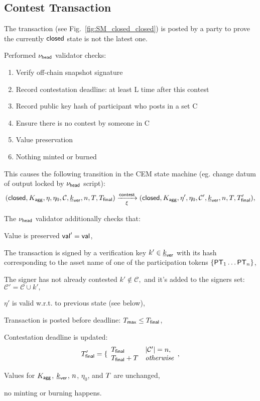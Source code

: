 \subsection{Contest Transaction} 

The \mtxContest{} transaction (see
Fig.~\ref{fig:SM_closed_closed}) is posted by a party to prove the currently $\mathsf{closed}$ state is not the latest one. 

\noindent Performed $\nu_\mathsf{head}$ validator checks:
\begin{enumerate}
   \item Verify off-chain snapshot signature
   \item Record contestation deadline: at least L time after this contest
   \item Record public key hash of participant who posts in a set C
   \item Ensure there is no contest by someone in C
   \item Value preservation
   \item Nothing minted or burned
\end{enumerate}

\noindent This causes the following transition in the CEM state machine (eg. change datum of output locked by $\nu_\mathsf{head}$ script):
$$
   (\mathsf{closed},K_{\mathsf{agg}},\eta,\eta_0,\mathcal{C},\underline{k}_{\mathsf{ver}},n,T,T_{\mathsf{final}}) \xrightarrow[\xi]{\mathsf{contest}} (\mathsf{closed},K_{\mathsf{agg}},\eta',\eta_0,\mathcal{C}', \underline{k}_{\mathsf{ver}},n,T,T_{\mathsf{final}}'),
$$

\noindent The $\nu_\mathsf{head}$ validator additionally checks that:
\begin{menumerate}
  \item Value is preserved $\mathsf{val}' = \mathsf{val}$,
  \item The transaction is signed by a verification key $k' \in \underline{k}_{\mathsf{ver}}$ with its
  hash corresponding to the asset name of one of the participation tokens
  $\{\mathsf{PT}_1 \dots \mathsf{PT}_n\}$,
  \item The signer has not already contested $k' \not\in \mathcal{C},$  and it's added to the signers set: $\mathcal{C}' = \mathcal{C} \cup k',$
  \item $\eta'$ is valid w.r.t. to previous state (see below), 
  \item Transaction is posted before deadline: $T_{\mathsf{max}} \leq T_{\mathsf{final}}$,
  \item Contestation deadline is updated:
     $$
     T_{\mathsf{final}}' = 
        \{\begin{array}{ll}
             T_{\mathsf{final}}     &  |\mathcal{C}'| = n, \\
             T_{\mathsf{final}} + T &  \mathit{otherwise} \\
        \end{array},
     $$
  \item Values for $K_{\mathsf{agg}}$, $\underline{k}_{\mathsf{ver}}$, $n$, $\eta_0$, and $T$ are unchanged,
  \item no minting or burning happens.
\end{menumerate}

